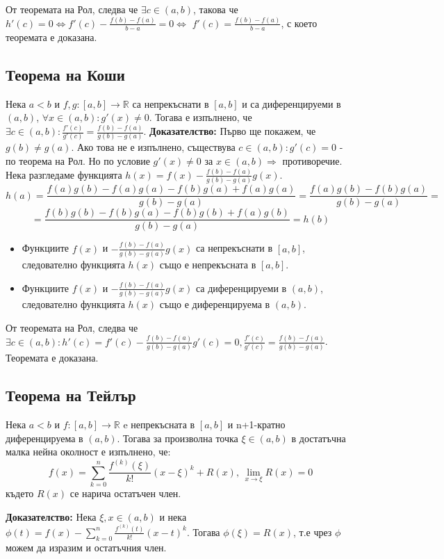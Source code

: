 \documentclass[fleqn,12pt]{article}
\begin{document}
От теоремата на Рол, следва че $\exists c \in (a,b)$, такова че  $h'(c) = 0 \Leftrightarrow f'(c) - \frac{f(b)-f(a)}{b-a} = 0 \Leftrightarrow$
$f'(c) = \frac{f(b)-f(a)}{b-a}$, с което теоремата е доказана.

\subsection{Теорема на Коши}
Нека $a<b$ и $f,g:[a,b]\rightarrow\mathbb{R}$ са непрекъснати в $[a,b]$ и са диференцируеми в $(a,b)$, $\forall x \in (a,b): g'(x) \neq 0$.
Тогава е изпълнено, че $\exists c \in (a,b): \frac{f'(c)}{g'(c)}=\frac{f(b)-f(a)}{g(b)-g(a)}$.
\bigbreak
\textbf{Доказателство:}
Първо ще покажем, че $g(b) \neq g(a)$. Ако това не е изпълнено, съществува $c \in (a,b): g'(c) = 0$ - по теорема на Рол. Но по условие $g'(x) \neq 0$ за $x \in (a,b) \Rightarrow$ противоречие.
Нека разгледаме функцията $h(x)=f(x) - \frac{f(b)-f(a)}{g(b)-g(a)}g(x)$.
\[ h(a)=\frac{f(a)g(b) - f(a)g(a) - f(b)g(a) + f(a)g(a)}{g(b)-g(a)} = \frac{f(a)g(b)-f(b)g(a)}{g(b)-g(a)} =  \]
\[ = \frac{f(b)g(b) - f(b)g(a) - f(b)g(b) + f(a)g(b)}{g(b)-g(a)} = h(b) \]
\begin{itemize}
    \item Функциите $f(x)$ и $-\frac{f(b)-f(a)}{g(b)-g(a)}g(x)$ са непрекъснати в $[a,b]$, следователно функцията $h(x)$ също е непрекъсната в $[a,b]$.
    \item Функциите $f(x)$ и $-\frac{f(b)-f(a)}{g(b)-g(a)}g(x)$ са диференцируеми в $(a,b)$, следователно функцията $h(x)$ също е диференцируема в $(a,b)$.
\end{itemize}

От теоремата на Рол, следва че $\exists c \in (a,b): h'(c) = f'(c) - \frac{f(b)-f(a)}{g(b)-g(a)}g'(c) = 0, \frac{f'(c)}{g'(c)} = \frac{f(b)-f(a)}{g(b)-g(a)}$.
Теоремата е доказана.


\subsection{Теорема на Тейлър}
Нека $a<b$ и $f:[a,b]\rightarrow\mathbb{R}$ e непрекъсната в $[a,b]$ и n+1-кратно диференцируема в $(a,b)$. 
Тогава за произволна точка $\xi \in (a,b)$ в достатъчна малка нейна околност е изпълнено, че:
\[f(x)=\sum_{k = 0}^{n} \frac{f^{(k)}(\xi)}{k!}(x-\xi)^k + R(x) \text{, } \lim_{x \rightarrow \xi} R(x) = 0\]
където $R(x)$ се нарича остатъчен член.

\textbf{Доказателство:}
Нека $\xi,x \in (a,b)$ и нека $\phi(t) = f(x) - \sum_{k = 0}^{n} \frac{f^{(k)}(t)}{k!}(x-t)^{k}$.
Тогава $\phi(\xi)=R(x)$, т.е чрез $\phi$ можем да изразим и остатъчния член.
\end{document}
